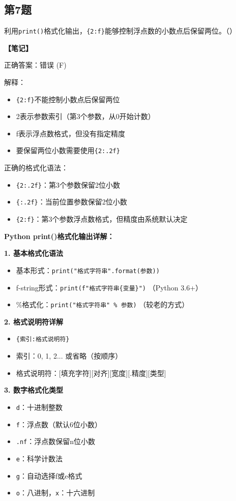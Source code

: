\subsection{第7题}
利用\texttt{print()}格式化输出，\verb|{2:f}|能够控制浮点数的小数点后保留两位。（\quad）

\begin{mdframed}[linewidth=1pt, linecolor=black]
  \textbf{\color{red}【笔记】}

  正确答案：错误 (F)

  解释：
  \begin{itemize}
    \item \verb|{2:f}|不能控制小数点后保留两位
    \item 2表示参数索引（第3个参数，从0开始计数）
    \item f表示浮点数格式，但没有指定精度
    \item 要保留两位小数需要使用\verb|{2:.2f}|
  \end{itemize}

  正确的格式化语法：
  \begin{itemize}
    \item \verb|{2:.2f}|：第3个参数保留2位小数
    \item \verb|{:.2f}|：当前位置参数保留2位小数
    \item \verb|{2:f}|：第3个参数浮点数格式，但精度由系统默认决定
  \end{itemize}

  \textbf{Python print()格式化输出详解：}

  \textbf{1. 基本格式化语法}
  \begin{itemize}
    \item 基本形式：\verb|print("格式字符串".format(参数))|
    \item f-string形式：\verb|print(f"格式字符串{变量}")| （Python 3.6+）
    \item \%格式化：\verb|print("格式字符串" % 参数)| （较老的方式）
    \end{itemize}

    \textbf{2. 格式说明符详解}
    \begin{itemize}
      \item \verb|{索引:格式说明符}|
      \item 索引：0, 1, 2... 或省略（按顺序）
      \item 格式说明符：[填充字符][对齐][宽度][.精度][类型]
    \end{itemize}

    \textbf{3. 数字格式化类型}
    \begin{itemize}
      \item \texttt{d}：十进制整数
      \item \texttt{f}：浮点数（默认6位小数）
      \item \texttt{.nf}：浮点数保留n位小数
      \item \texttt{e}：科学计数法
      \item \texttt{g}：自动选择f或e格式
      \item \texttt{o}：八进制，\texttt{x}：十六进制
    \end{itemize}


\end{mdframed}
